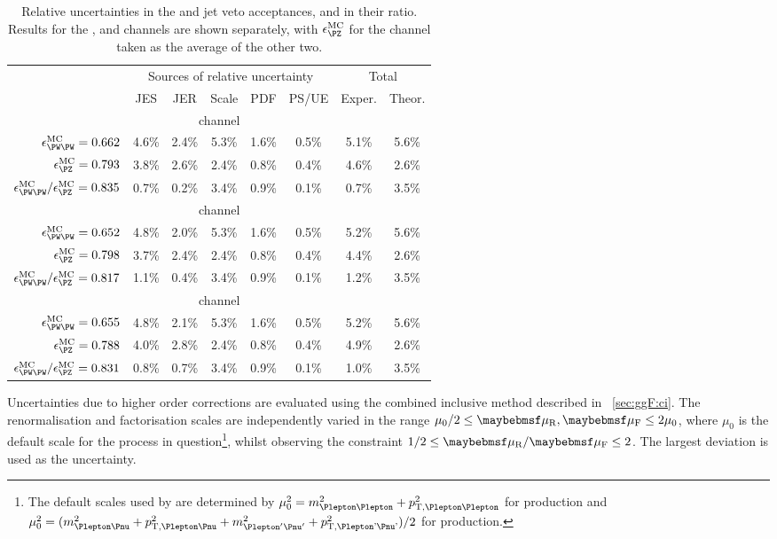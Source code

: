 \begin{table}[t]
	\begin{tabular}{r|ccccc|cc}
		\toprule
		& \multicolumn{5}{c|}{Sources of relative uncertainty} & \multicolumn{2}{c}{Total} \\
		& JES & JER & Scale & PDF & PS/UE & Exper. & Theor. \\
		\midrule
		\multicolumn{8}{c}{\emch channel} \\
		\midrule
		$\epsilon^{\text{MC}}_{\WW} = 0.662$ 
		& 4.6\% & 2.4\% & 5.3\% & 1.6\% & 0.5\% & 5.1\% & 5.6\% \\
		$\epsilon^{\text{MC}}_{\PZ} = 0.793$ 
		& 3.8\% & 2.6\% & 2.4\% & 0.8\% & 0.4\% & 4.6\% & 2.6\% \\
		$\epsilon^{\text{MC}}_{\WW} / \epsilon^{\text{MC}}_{\PZ} = 0.835$ 
		& 0.7\% & 0.2\% & 3.4\% & 0.9\% & 0.1\% & 0.7\% & 3.5\% \\
		\midrule
		\multicolumn{8}{c}{\eech channel} \\
		\midrule
		$\epsilon^{\text{MC}}_{\WW} = 0.652$ 
		& 4.8\% & 2.0\% & 5.3\% & 1.6\% & 0.5\% & 5.2\% & 5.6\% \\
		$\epsilon^{\text{MC}}_{\PZ} = 0.798$ 
		& 3.7\% & 2.4\% & 2.4\% & 0.8\% & 0.4\% & 4.4\% & 2.6\% \\
		$\epsilon^{\text{MC}}_{\WW} / \epsilon^{\text{MC}}_{\PZ} = 0.817$ 
		& 1.1\% & 0.4\% & 3.4\% & 0.9\% & 0.1\% & 1.2\% & 3.5\% \\
		\midrule
		\multicolumn{8}{c}{\mmch channel} \\
		\midrule
		$\epsilon^{\text{MC}}_{\WW} = 0.655$ 
		& 4.8\% & 2.1\% & 5.3\% & 1.6\% & 0.5\% & 5.2\% & 5.6\% \\
		$\epsilon^{\text{MC}}_{\PZ} = 0.788$ 
		& 4.0\% & 2.8\% & 2.4\% & 0.8\% & 0.4\% & 4.9\% & 2.6\% \\
		$\epsilon^{\text{MC}}_{\WW} / \epsilon^{\text{MC}}_{\PZ} = 0.831$ 
		& 0.8\% & 0.7\% & 3.4\% & 0.9\% & 0.1\% & 1.0\% & 3.5\% \\
		\bottomrule
	\end{tabular}
	\caption{Relative uncertainties in the \WW and \PZ jet veto acceptances, and in their 
	ratio. Results for the \eech, \mmch and \emch channels are shown separately, with 
	$\epsilon^{\text{MC}}_{\PZ}$ for the \emch channel taken as the average of the other 
	two.}
	\label{tab:ww:jetveto_unc}
\end{table}

Uncertainties due to higher order corrections are evaluated using the combined inclusive 
method described in \Section~\ref{sec:ggF:ci}. The renormalisation and factorisation 
scales are independently varied in the range $\mu_0/2 \leq \mur,\muf \leq 2\mu_0$, where 
$\mu_0$ is the default scale for the process in question\footnote{
	The default scales used by \mcatnlo are determined by 
	$\mu_0^2 = m_{\Plepton\Plepton}^2 + p_{\text{T,\HepProcess{\Plepton\Plepton}}}^2$ 
	for \PZ production and 
	$\mu_0^2 = (m_{\Plepton\Pnu}^2 + p_{\text{T,\HepProcess{\Plepton\Pnu}}}^2 + 
	m_{\Plepton'\Pnu'}^2 + p_{\text{T,\HepProcess{\Plepton'\Pnu'}}}^2) / 2$
	for \WW production.
}, whilst observing the constraint $1/2 \leq \mur/\muf \leq 2$. The largest deviation is 
used as the uncertainty.

